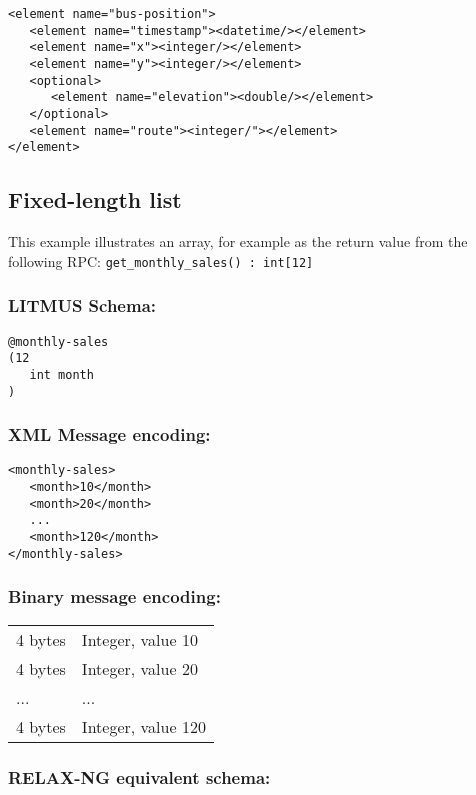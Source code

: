 \documentclass[12pt,a4paper,twoside]{article}
\renewcommand{\_}{\texttt{\symbol{95}}}
\begin{document}
\begin{verbatim}
<element name="bus-position">
   <element name="timestamp"><datetime/></element>
   <element name="x"><integer/></element>
   <element name="y"><integer/></element>
   <optional>
      <element name="elevation"><double/></element>
   </optional>
   <element name="route"><integer/"></element>
</element>
\end{verbatim}

\subsection{Fixed-length list}

This example illustrates an array, for example as the return value from
the following RPC:
\verb^get_monthly_sales() : int[12]^

\subsubsection*{LITMUS Schema:}

\begin{verbatim}
@monthly-sales
(12
   int month
)
\end{verbatim}

\subsubsection*{XML Message encoding:}

\begin{verbatim}
<monthly-sales>
   <month>10</month>
   <month>20</month>
   ...
   <month>120</month>
</monthly-sales>
\end{verbatim}

\subsubsection*{Binary message encoding:}

\begin{tabular}{ll}
4 bytes & Integer, value 10\\
4 bytes & Integer, value 20\\
... & ...\\
4 bytes & Integer, value 120\\
\end{tabular}

\subsubsection*{RELAX-NG equivalent schema:}
\end{document}

